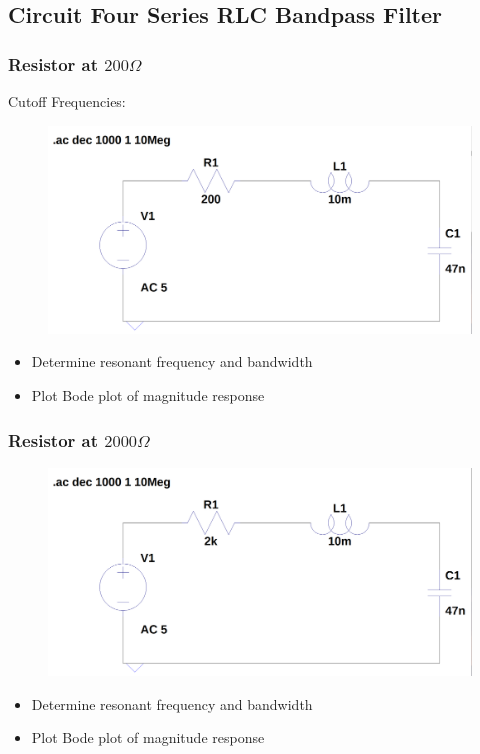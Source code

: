 \documentclass[12pt]{article}
\begin{document}
\subsection{Circuit Four Series RLC Bandpass Filter}
\subsubsection{Resistor at $200\Omega$}
Cutoff Frequencies:

\begin{figure}[H]
	\includegraphics[width=\textwidth]{e6_04}
\end{figure}
\begin{itemize}
	\item Determine resonant frequency and bandwidth
	\item Plot Bode plot of magnitude response
\end{itemize}
\subsubsection{Resistor at $2000\Omega$}
\begin{figure}[H]
	\includegraphics[width=\textwidth]{e6_05}
\end{figure}
\begin{itemize}
	\item Determine resonant frequency and bandwidth
	\item Plot Bode plot of magnitude response
\end{itemize}
\end{document}
